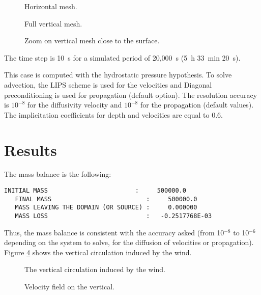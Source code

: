 \begin{figure}[!htbp]
 \centering
 \caption{Horizontal mesh.}
 \label{t3d:vent:fig:meshH}
\end{figure}

\begin{figure}[!htbp]
 \centering
 \caption{Full vertical mesh.}
 \label{t3d:vent:fig:meshV}
 \end{figure}

 \begin{figure}[!htbp]
 \centering
 \caption{Zoom on vertical mesh close to the surface.}
  \label{t3d:vent:fig:meshV_Zoom}
  \end{figure}

\bigskip
The time step is 10~s for a simulated period of 20,000~s (5~h 33~min 20~s).

\bigskip
This case is computed with the hydrostatic pressure hypothesis. To solve advection,
the LIPS scheme is used for the velocities
and Diagonal preconditioning is used for propagation (default option).
The resolution accuracy is $10^{-8}$ for the diffusivity velocity
and $10^{-8}$ for the propagation (default values). The implicitation coefficients
for depth and velocities are equal to 0.6.

\section{Results}
\bigskip
The mass balance is the following:
\begin{lstlisting}[language=TelFortran]
   INITIAL MASS                        :     500000.0
   FINAL MASS                          :     500000.0
   MASS LEAVING THE DOMAIN (OR SOURCE) :     0.000000
   MASS LOSS                           :   -0.2517768E-03
\end{lstlisting}

\bigskip
Thus, the mass balance is consistent with the accuracy asked
(from 10$^{-8}$ to 10$^{-6}$ depending on the system to solve,
for the diffusion of velocities or propagation).
Figure \ref{t3d:vent:fig:vecVelo} shows the vertical circulation induced by the wind.
\begin{figure}[!htbp]
 \centering
 \caption{The vertical circulation induced by the wind.}
 \label{t3d:vent:fig:vecVelo}
 \end{figure}
 \begin{figure}[!htbp]
 \centering
 \caption{Velocity field on the vertical.}
 \label{t3d:vent:fig:fieldvelo}
\end{figure}

